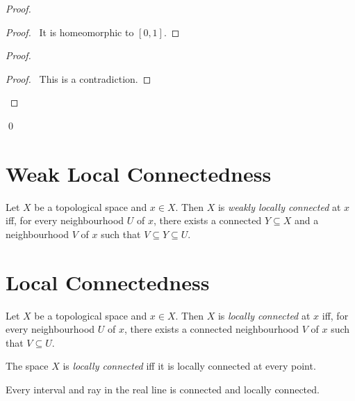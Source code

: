 \begin{proof}
\pf
{}
\begin{proof}
	\pf\ It is homeomorphic to $[0,1]$.
\end{proof}
\begin{proof}
	\qedstep
	\begin{proof}
		\pf\ This is a contradiction.
	\end{proof}
\end{proof}
\qed
\end{proof}

\section{Weak Local Connectedness}

\begin{df}
Let $X$ be a topological space and $x \in X$. Then $X$ is \emph{weakly locally connected} at $x$ iff, for every neighbourhood $U$ of $x$, there exists a connected $Y \subseteq X$ and a neighbourhood $V$ of $x$ such that $V \subseteq Y \subseteq U$.
\end{df}

\section{Local Connectedness}

\begin{df}
Let $X$ be a topological space and $x \in X$. Then $X$ is \emph{locally connected} at $x$ iff, for every neighbourhood $U$ of $x$, there exists a connected neighbourhood $V$ of $x$ such that $V \subseteq U$.

The space $X$ is \emph{locally connected} iff it is locally connected at every point.
\end{df}

\begin{ex}
Every interval and ray in the real line is connected and locally connected.
\end{ex}

